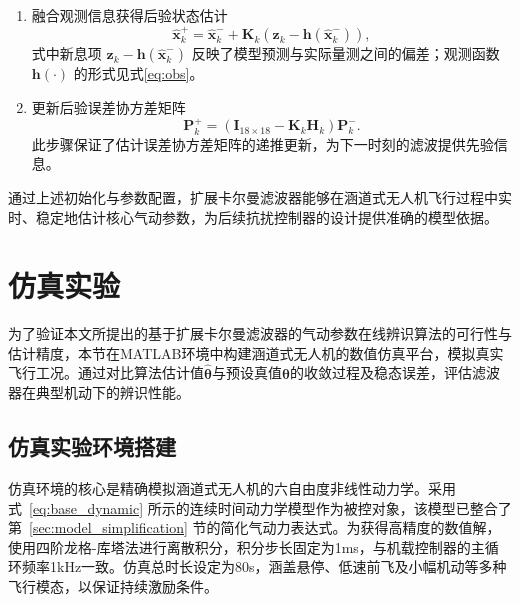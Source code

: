 \begin{enumerate}
    在实际的工程应用中，通常认为各个观测量噪声之间不存在相关性。此外，在飞行期间，观测噪声的噪声模型基本保持一致，因此，为降低计算复杂度，可将$\bm{R}_k$设为常对角阵：
    \begin{equation}
        \bm{R} = \operatorname{diag}(\sigma^2_{p_x},\sigma^2_{p_y}, \sigma^2_{p_z}, \sigma^2_{v_x},\sigma^2_{v_y}, \sigma^2_{v_z}, \sigma^2_{\varphi},\sigma^2_{\theta}, \sigma^2_{\psi}, \sigma^2_{p},\sigma^2_{q}, \sigma^2_{r}).
    \end{equation}
    其中，对角线元素可直接取自传感器的标称噪声方差，如动作捕捉系统的位置测量方差、IMU的角速度测量方差等。

    \item {融合观测信息获得后验状态估计}
    \begin{equation}
        \hat{\bm{x}}_{k}^{+} = \hat{\bm{x}}_{k}^{-} + \bm{K}_k \left( \bm{z}_k - \bm{h}(\hat{\bm{x}}_{k}^{-}) \right),
    \end{equation}
    式中新息项 $\bm{z}_k - \bm{h}(\hat{\bm{x}}_{k}^{-})$ 反映了模型预测与实际量测之间的偏差；观测函数 $\bm{h}(\cdot)$ 的形式见式\eqref{eq:obs}。

    \item {更新后验误差协方差矩阵}
    \begin{equation}
        \bm{P}_{k}^{+} = \left( \bm{I}_{18\times 18} - \bm{K}_k \bm{H}_k \right) \bm{P}_{k}^{-}.
    \end{equation}
    此步骤保证了估计误差协方差矩阵的递推更新，为下一时刻的滤波提供先验信息。
\end{enumerate}

通过上述初始化与参数配置，扩展卡尔曼滤波器能够在涵道式无人机飞行过程中实时、稳定地估计核心气动参数，为后续抗扰控制器的设计提供准确的模型依据。

\section{仿真实验}%
为了验证本文所提出的基于扩展卡尔曼滤波器的气动参数在线辨识算法的可行性与估计精度，本节在MATLAB环境中构建涵道式无人机的数值仿真平台，模拟真实飞行工况。通过对比算法估计值$\hat{\bm{\theta}}$与预设真值$\bm{\theta}$的收敛过程及稳态误差，评估滤波器在典型机动下的辨识性能。

\subsection{仿真实验环境搭建}
仿真环境的核心是精确模拟涵道式无人机的六自由度非线性动力学。采用式~\eqref{eq:base_dynamic} 所示的连续时间动力学模型作为被控对象，该模型已整合了第~\ref{sec:model_simplification} 节的简化气动力表达式。为获得高精度的数值解，使用四阶龙格-库塔法进行离散积分，积分步长固定为1ms，与机载控制器的主循环频率1kHz一致。仿真总时长设定为80s，涵盖悬停、低速前飞及小幅机动等多种飞行模态，以保证持续激励条件。

